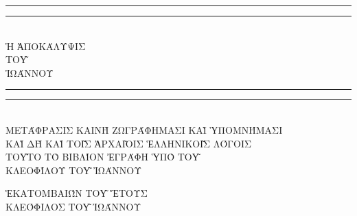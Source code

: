 \begin{doubletitle}
    \textheight
    \centering
    \vspace*{\baselineskip}
    \rule{\textwidth}{1.6pt}\vspace*{-\baselineskip}\vspace*{2pt}
    \rule{\textwidth}{0.4pt}\\[\baselineskip]
    {\uppercase{\LARGE Ἡ Ἀποκάλυψις \\ τοῦ \\[0.3\baselineskip] Ἰωάννου }}\\[0.2\baselineskip]
    \rule{\textwidth}{0.4pt}\vspace*{-\baselineskip}\vspace{3.2pt}
    \rule{\textwidth}{1.6pt}\\[\baselineskip]
    \scshape
    \uppercase{Μετάφρασις καινὴ ζωγράφημασι καὶ ὑπομνήμασι \\
    καὶ δὴ καὶ τοῖς ἀρχαῖοις Ἑλληνικοῖς λόγοις} \\ 
    \vspace*{2\baselineskip}  
    \uppercase{Τοῦτο τὸ βιβλίον ἐγράφη ὑπὸ τοῦ \\[\baselineskip]
    {\Large Κλεοφίλου τοῦ Ἰωάννου}}\par
    \vfill
    {\scshape \uppercase{Ἑκατομβαιών τοῦ} } \uppercase{ἔτους}  \\
    {\large \uppercase{Κλεόφιλος τοῦ Ἰωάννου}}\par
\end{doubletitle}
